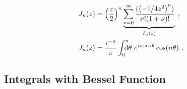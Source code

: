 \begin{gather}
    \begin{aligned}
        J_n(z) &= \left(\frac{z}{2}\right)^n \underbrace{\sum^{\infty}_{\nu = 0} \frac{(\left(- 1/4 z^2\right)^\nu)}{\nu! (1 + \nu) !}}_{I_n(z)}~, \\
        J_n(z) &= \frac{i^{-n}}{\pi} \int_{0}^{\pi} \!\!\!\!\! \mathrm{d}\theta ~ e^{i z \cos \theta} \cos (n\theta)~.
    \end{aligned}
    \label{eq:Besselfunction}
\end{gather}

\newpage

\subsection*{Integrals with Bessel Function}
\label{sub:integralBesselfunction}


